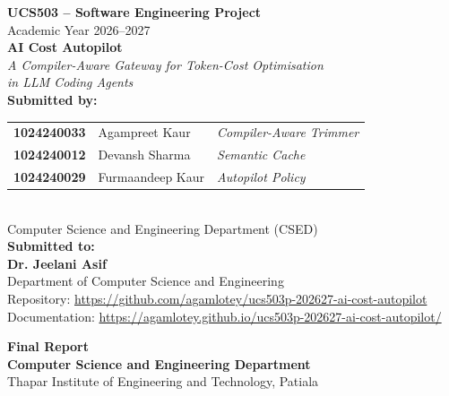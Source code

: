 \documentclass[12pt, a4paper, oneside]{report}
\begin{document}
\begin{titlepage}
    \centering
    \vspace*{0.5cm}

    {\Large\bfseries UCS503 -- Software Engineering Project}\\[0.3cm]
    {\large Academic Year 2026--2027}\\[1.5cm]

    {\Huge\bfseries AI Cost Autopilot}\\[0.4cm]
    {\large\textit{A Compiler-Aware Gateway for Token-Cost Optimisation\\in LLM Coding Agents}}\\[2.0cm]

    {\large\textbf{Submitted by:}}\\[0.3cm]
    \begin{tabular}{lll}
        \textbf{1024240033} & Agampreet Kaur   & \textit{Compiler-Aware Trimmer} \\
        \textbf{1024240012} & Devansh Sharma   & \textit{Semantic Cache} \\
        \textbf{1024240029} & Furmaandeep Kaur & \textit{Autopilot Policy} \\
    \end{tabular}\\[0.5cm]
    {\normalsize Computer Science and Engineering Department (CSED)}\\[1.2cm]

    {\large\textbf{Submitted to:}}\\[0.2cm]
    {\large\textbf{Dr. Jeelani Asif}}\\[0.1cm]
    {\normalsize Department of Computer Science and Engineering}\\[1.2cm]

    {\normalsize Repository: \url{https://github.com/agamlotey/ucs503p-202627-ai-cost-autopilot}}\\[0.15cm]
    {\normalsize Documentation: \url{https://agamlotey.github.io/ucs503p-202627-ai-cost-autopilot/}}

    \vfill
    {\normalsize\textbf{Final Report}}\\[0.15cm]
    {\normalsize\textbf{Computer Science and Engineering Department}}\\[0.1cm]
    {\normalsize Thapar Institute of Engineering and Technology, Patiala}\\[0.4cm]
\end{titlepage}
\end{document}
